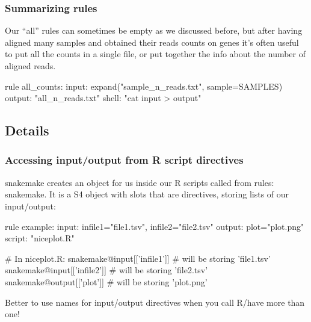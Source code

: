 \documentclass[xcolor=table]{beamer}
\begin{document}
\begin{frame}[fragile]
\frametitle{Summarizing rules}
Our ``all'' rules can sometimes be empty as we discussed before, but
after having aligned many samples and obtained their reads counts on genes it's often useful to put all the counts in a single file, or put together
the info about the number of aligned reads.
\begin{python}[basicstyle=\small]
rule all_counts:
   input: expand("{sample}_n_reads.txt", sample=SAMPLES)
   output: "all_n_reads.txt"
   shell: "cat {input} > {output}"
\end{python}
\end{frame}

\subsection{Details}
\begin{frame}[fragile]
\frametitle{Accessing input/output from R script directives}
\begin{tiny}
snakemake creates an object for us inside our R scripts called from rules: snakemake. It is a S4 object
with slots that are directives, storing lists of our input/output:
\end{tiny}
\begin{python}
rule example:
	input: infile1="file1.tsv", infile2="file2.tsv"
	output: plot="plot.png"
	script: "niceplot.R"
	
# In niceplot.R:
snakemake@input[['infile1']] # will be storing 'file1.tsv'
snakemake@input[['infile2']] # will be storing 'file2.tsv'
snakemake@output[['plot']]  # will be storing 'plot.png'
\end{python}
\begin{tiny}
Better to use names for input/output directives when you call R/have more than one!
\end{tiny}
\end{frame}
\end{document}
